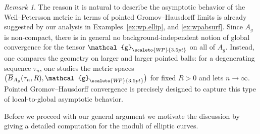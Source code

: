 \documentclass[11pt]{amsart}
\theoremstyle{plain}
\theoremstyle{definition}
\theoremstyle{remark}
\newtheorem{remark}[theorem]{Remark}
\newcommand{\g}{\mathcal{g}}
\newcommand{\WP}{\scaleto{W\!P}{3.5pt}}
\begin{document}
\begin{remark}
The reason it is natural to describe the asymptotic behavior of the Weil--Petersson metric in terms of pointed Gromov--Hausdorff limits is already suggested by our analysis in Examples~\ref{ex:wp.ellip}, and \ref{ex:wpabsurf}. Since $A_g$ is non-compact, there is in general no background-independent notion of global convergence for the tensor $\g_{\WP}$ on all of $A_g$. Instead, one compares the geometry on larger and larger pointed balls: for a degenerating sequence $\tau_n$, one studies the metric spaces $\bigl(\overline B_{A_g}(\tau_n,R),\g_{\WP}\bigr)$
for fixed $R>0$ and lets $n\to\infty$. Pointed Gromov--Hausdorff convergence is precisely designed to capture this type of local-to-global asymptotic behavior.
\end{remark}

Before we proceed with our general argument we motivate the discussion by giving a detailed computation for the moduli of elliptic curves.
\end{document}
